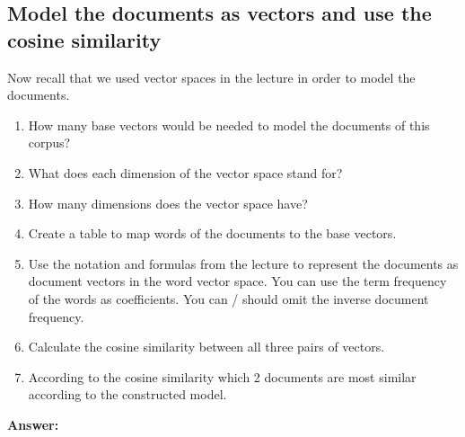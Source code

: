 \documentclass{WeSTassignment}
\begin{document}
\subsection{Model the documents as vectors and use the cosine similarity}
Now recall that we used vector spaces in the lecture in order to model the documents. 

\begin{enumerate}
\item How many base vectors would be needed to model the documents of this corpus?
\item What does each dimension of the vector space stand for?
\item How many dimensions does the vector space have? 
\item Create a table to map words of the documents to the base vectors.
\item Use the notation and formulas from the lecture to represent the documents as document vectors in the word vector space. You can use the term frequency of the words as coefficients. You can / should omit the inverse document frequency.
\item Calculate the cosine similarity between all three pairs of vectors.
\item According to the cosine similarity which 2 documents are most similar according to the constructed model. 
\end{enumerate}

\textbf{Answer:}
\end{document}
